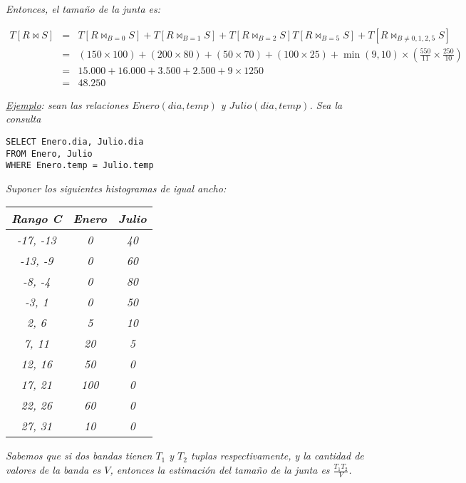 \documentclass[a4paper, twoside]{article}
\begin{document}
\emph{Entonces, el tamaño de la junta es:}

\emph{
\begin{eqnarray*}
T\left[R\bowtie S\right] & = & T\left[R\bowtie_{B=0}S\right]+T\left[R\bowtie_{B=1}S\right]+T\left[R\bowtie_{B=2}S\right]T\left[R\bowtie_{B=5}S\right]+T\left[R\bowtie_{B\neq0,1,2,5}S\right]\\
 & = & \left(150\times100\right)+\left(200\times80\right)+\left(50\times70\right)+\left(100\times25\right)+\min(9,10)\times\left(\frac{550}{11}\times\frac{250}{10}\right)\\
 & = & 15.000+16.000+3.500+2.500+9\times1250\\
 & = & 48.250
\end{eqnarray*}
}

\emph{\uline{Ejemplo}}\emph{: sean las relaciones $Enero(dia,temp)$
y $Julio(dia,temp)$. Sea la consulta}

\begin{lstlisting}
SELECT Enero.dia, Julio.dia
FROM Enero, Julio
WHERE Enero.temp = Julio.temp
\end{lstlisting}


\emph{Suponer los siguientes histogramas de igual ancho:}

\noindent \begin{center}
\emph{}%
\begin{tabular}{|c|c|c|}
\hline 
\emph{Rango C\textdegree{}} & \emph{Enero} & \emph{Julio}\\
\hline 
\hline 
\emph{-17, -13} & \emph{0} & \emph{40}\\
\hline 
\emph{-13, -9} & \emph{0} & \emph{60}\\
\hline 
\emph{-8, -4} & \emph{0} & \emph{80}\\
\hline 
\emph{-3, 1} & \emph{0} & \emph{50}\\
\hline 
\emph{2, 6} & \emph{5} & \emph{10}\\
\hline 
\emph{7, 11} & \emph{20} & \emph{5}\\
\hline 
\emph{12, 16} & \emph{50} & \emph{0}\\
\hline 
\emph{17, 21} & \emph{100} & \emph{0}\\
\hline 
\emph{22, 26} & \emph{60} & \emph{0}\\
\hline 
\emph{27, 31} & \emph{10} & \emph{0}\\
\hline 
\end{tabular}
\par\end{center}

\emph{Sabemos que si dos bandas tienen $T_{1}$ y $T_{2}$ tuplas
respectivamente, y la cantidad de valores de la banda es $V$, entonces
la estimación del tamaño de la junta es $\frac{T_{1}T_{2}}{V}$.}
\end{document}
